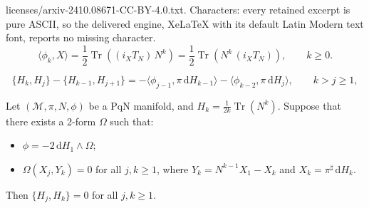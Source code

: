 \documentclass[10pt,a4paper]{amsart}
\def\M{{\mathcal M}}
\def\Tr{\operatorname{Tr}}
\newcommand{\brke}[2]{{{\langle #1,#2\rangle}}}
\def\d{{\mathrm d}}
\def\parpo#1#2{\{#1,#2\}}
\begin{document}
licenses/arxiv-2410.08671-CC-BY-4.0.txt. Characters: every retained excerpt is pure ASCII, so the delivered engine, XeLaTeX with its default Latin Modern text font, reports no missing character.
\begin{equation}
\label{varphi}
\brke{\phi_k}{ X}= \frac12\Tr\left((i_XT_N)\, N^{k}\right)= \frac12\Tr\left(N^{k}\, (i_XT_N)\right),\qquad k\ge 0.
\end{equation}

\begin{equation}
\label{recadd}
\parpo{H_k}{H_j}-\parpo{H_{k-1}}{H_{j+1}}=-\brke{ \phi_{j-1}}{\pi\, \d H_{k-1}}-\brke{\phi_{k-2}}{ \pi\, \d H_j},
\qquad k>j \ge 1,
\end{equation}

\begin{theorem} 
\label{thm:involution}
Let $(\M,\pi,N,\phi)$ be a PqN manifold,  
and $H_k=\frac1{2k}\Tr({N}^k)$. Suppose that there exists a 2-form $\Omega$ such that:
\begin{itemize}
\item[$(a)$] $\phi=-2\,\d H_1\wedge\Omega$; 
\item[$(b)$] $\Omega(X_j,{Y_k})=0$ for all $j,k\ge 1$, where $Y_k=N^{k-1}X_1-X_k$ and $X_k=\pi^\sharp\,\d H_k$.
\end{itemize}
Then %
$\parpo{H_j}{H_k}=0$ for all $j,k\ge 1$. 
\end{theorem}
\end{document}
